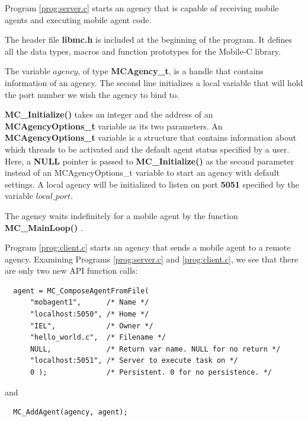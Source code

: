 \documentclass[11pt]{report}
\begin{document}
Program \vref{prog:server.c} starts an agency that is capable of 
receiving mobile agents and executing mobile agent code. 

{\footnotesize \linespread{1.0} }
\noindent
The header file {\bf libmc.h} is included at the beginning of the program. 
It defines all the data types, macros and function prototypes for the 
Mobile-C library.

{\footnotesize \linespread{1.0} }
\noindent
The variable $agency$, of type {\bf MCAgency\_t}, is a handle that contains 
information of an agency. The second line initializes a local variable that will
hold the port number we wish the agency to bind to.

{\footnotesize \linespread{1.0} }
\noindent
{\bf MC\_Initialize()}  takes an integer and the address of an 
{\bf MCAgencyOptions\_t}  variable as its two parameters. 
An {\bf MCAgencyOptions\_t} variable is a structure that contains 
information about which threads to be activated and the default agent 
status specified by a user.
Here, a {\bf NULL} pointer is passed to {\bf MC\_Initialize()} as the second 
parameter instead of an MCAgencyOptions\_t variable to start an agency with 
default settings. 
A local agency will be initialized to listen on port {\bf 5051} specified by 
the variable $local\_port$.

{\footnotesize \linespread{1.0} }
\noindent
The agency waits indefinitely for a mobile agent by the function 
{\bf MC\_MainLoop()} . 

Program \ref{prog:client.c} starts an agency that sends a mobile agent to 
a remote agency.
Examining Programs \ref{prog:server.c} and \ref{prog:client.c}, we see
that there are only two new API function calls:
\begin{verbatim}
  agent = MC_ComposeAgentFromFile(
      "mobagent1",      /* Name */
      "localhost:5050", /* Home */
      "IEL",            /* Owner */
      "hello_world.c",  /* Filename */
      NULL,             /* Return var name. NULL for no return */
      "localhost:5051", /* Server to execute task on */
      0 );              /* Persistent. 0 for no persistence. */
\end{verbatim}
and
\begin{verbatim}
  MC_AddAgent(agency, agent);
\end{verbatim}
\end{document}
